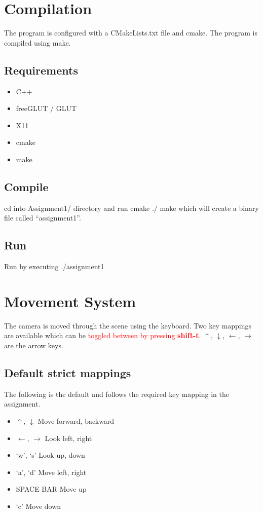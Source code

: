 \documentclass[10pt, oneside]{article}   	%
\begin{document}
\section{Compilation}
The program is configured with a CMakeLists.txt file and cmake.  The program is compiled using make.

\subsection{Requirements}
\begin{itemize}
\item C++
\item freeGLUT / GLUT
\item X11
\item cmake
\item make
\end{itemize}

\subsection{Compile}
cd into Assignment1/ directory and run
\newline \newline
{\small {}\selectfont
cmake ./
\newline
make
}
\newline \newline
which will create a binary file called ``assignment1''.

\subsection{Run}
Run by executing
\newline \newline
{\small {}\selectfont
./assignment1
}



\section{Movement System}
The camera is moved through the scene using the keyboard.  Two key mappings are available which can be \textcolor{red}{toggled between by pressing \textbf{shift-t}.}  $\uparrow$, $\downarrow$, $\leftarrow$, $\rightarrow$ are the arrow keys.
\newline
\subsection{Default strict mappings}
The following is the default and follows the required key mapping in the assignment.
\begin{itemize}
\item $\uparrow$, $\downarrow$ Move forward, backward
\item $\leftarrow$, $\rightarrow$ Look left, right
\item `w', `s' Look up, down
\item `a', `d' Move left, right
\item SPACE BAR Move up
\item `c' Move down
\end{itemize}
\end{document}
